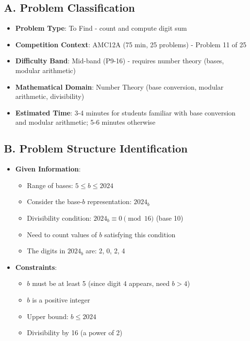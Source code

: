 \documentclass[11pt]{article}
\begin{document}
\begin{problemconfigbox}
\subsection*{A. Problem Classification}
\begin{itemize}[leftmargin=*]
    \item \textbf{Problem Type}: To Find - count and compute digit sum
    \item \textbf{Competition Context}: AMC12A (75 min, 25 problems) - Problem 11 of 25
    \item \textbf{Difficulty Band}: Mid-band (P9-16) - requires number theory (bases, modular arithmetic)
    \item \textbf{Mathematical Domain}: Number Theory (base conversion, modular arithmetic, divisibility)
    \item \textbf{Estimated Time}: 3-4 minutes for students familiar with base conversion and modular arithmetic; 5-6 minutes otherwise
\end{itemize}

\subsection*{B. Problem Structure Identification}
\begin{itemize}[leftmargin=*]
    \item \textbf{Given Information}: 
    \begin{itemize}
        \item Range of bases: $5 \leq b \leq 2024$
        \item Consider the base-$b$ representation: $2024_b$
        \item Divisibility condition: $2024_b \equiv 0 \pmod{16}$ (base 10)
        \item Need to count values of $b$ satisfying this condition
        \item The digits in $2024_b$ are: 2, 0, 2, 4
    \end{itemize}
    
    \item \textbf{Constraints}: 
    \begin{itemize}
        \item $b$ must be at least 5 (since digit 4 appears, need $b > 4$)
        \item $b$ is a positive integer
        \item Upper bound: $b \leq 2024$
        \item Divisibility by 16 (a power of 2)
    \end{itemize}
    

\end{itemize}
\end{problemconfigbox}
\end{document}
